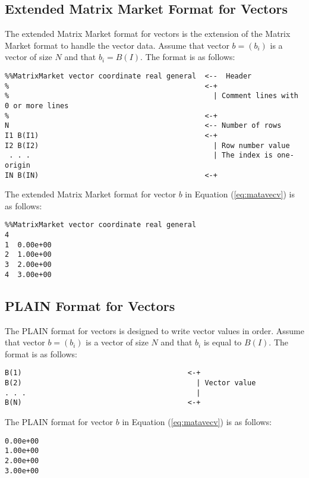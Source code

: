\documentclass[a4paper]{article}
\begin{document}
\subsection{Extended Matrix Market Format for Vectors}
The extended Matrix Market format for vectors is 
the extension of the Matrix Market format to handle the vector data. 
Assume that vector $b=(b_{i})$ is a vector of size 
$N$ and that $b_{i} = B(I)$. The format is as follows:

{\small
\begin{verbatim}
%%MatrixMarket vector coordinate real general  <--  Header
%                                              <-+ 
%                                                | Comment lines with 0 or more lines
%                                              <-+
N                                              <-- Number of rows
I1 B(I1)                                       <-+
I2 B(I2)                                         | Row number value
 . . .                                           | The index is one-origin
IN B(IN)                                       <-+ 
\end{verbatim}
}

The extended Matrix Market format for vector $b$ in Equation (\ref{eq:matavecv}) is as follows:

{\small
\begin{verbatim}
%%MatrixMarket vector coordinate real general
4
1  0.00e+00
2  1.00e+00
3  2.00e+00
4  3.00e+00
\end{verbatim}
}

\subsection{PLAIN Format for Vectors}
The PLAIN format for vectors is designed to write vector values in
order. Assume that vector $b=(b_{i})$ is a vector of size $N$ and
that $b_{i}$ is equal to $B(I)$. The format is as follows:

{\small
\begin{verbatim}
B(1)                                       <-+
B(2)                                         | Vector value
. . .                                        | 
B(N)                                       <-+ 
\end{verbatim}
}

The PLAIN format for vector $b$ in Equation (\ref{eq:matavecv}) is as follows: 

{\small
\begin{verbatim}
0.00e+00
1.00e+00
2.00e+00
3.00e+00
\end{verbatim}
}
\end{document}
